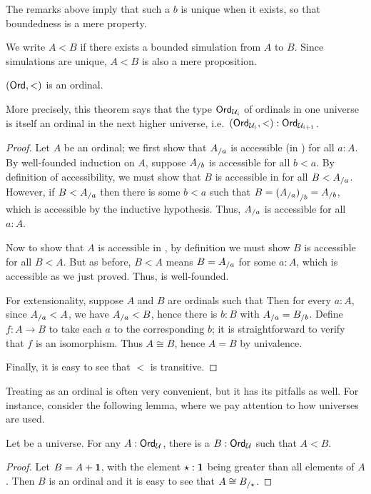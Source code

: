 The remarks above imply that such a $b$ is unique when it exists, so that boundedness is a mere property.

We write $A<B$ if there exists a bounded simulation from $A$ to $B$.
Since simulations are unique, $A<B$ is also a mere proposition.

\begin{thm}\label{thm:ordord}
  $(\mathsf{Ord},<)$ is an ordinal.
\end{thm}

\noindent
More precisely, this theorem says that the type $\mathsf{Ord}_{\mathcal{U}_i}$ of ordinals in one universe is itself an ordinal in the next higher universe, i.e.\ $(\mathsf{Ord}_{\mathcal{U}_i},<):\mathsf{Ord}_{\mathcal{U}_{i+1}}$.

\begin{proof}
  Let $A$ be an ordinal; we first show that ${A}_{/a}$ is accessible (in \ord) for all $a:A$.
  By well-founded induction on $A$, suppose ${A}_{/b}$ is accessible for all $b<a$.
  By definition of accessibility, we must show that $B$ is accessible in \ord for all $B<{A}_{/a}$.
  However, if $B<{A}_{/a}$ then there is some $b<a$ such that $B = {({A}_{/a})}_{/b} = {A}_{/b}$, which is accessible by the inductive hypothesis.
  Thus, ${A}_{/a}$ is accessible for all $a:A$.

  Now to show that $A$ is accessible in \ord, by definition we must show $B$ is accessible for all $B<A$.
  But as before, $B<A$ means $B={A}_{/a}$ for some $a:A$, which is accessible as we just proved.
  Thus, \ord is well-founded.

  For extensionality, suppose $A$ and $B$ are ordinals such that
  Then for every $a:A$, since ${A}_{/a}<A$, we have ${A}_{/a}<B$, hence there is $b:B$ with ${A}_{/a} = {B}_{/b}$.
  Define $f:A\to B$ to take each $a$ to the corresponding $b$; it is straightforward to verify that $f$ is an isomorphism.
  Thus $A\cong B$, hence $A=B$ by univalence.

  Finally, it is easy to see that $<$ is transitive.
\end{proof}

Treating \ord as an ordinal is often very convenient, but it has its pitfalls as well.
For instance, consider the following lemma, where we pay attention to how universes are used.

\begin{lem}\label{thm:ordsucc}
  Let \bbU be a universe.
  For any $A:\mathsf{Ord}_\mathcal{U}$, there is a $B:\mathsf{Ord}_\mathcal{U}$ such that $A<B$.
\end{lem}
\begin{proof}
  Let $B=A+\mathbf{1}$, with the element $\star:\mathbf{1}$ being greater than all elements of $A$.
  Then $B$ is an ordinal and it is easy to see that $A\cong {B}_{/\star}$.
\end{proof}

